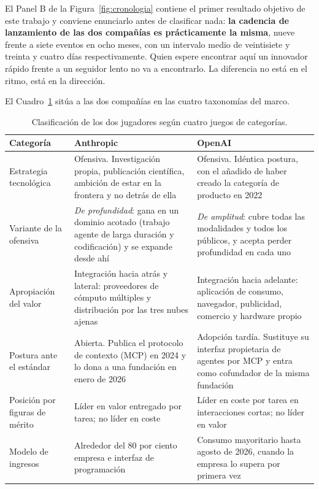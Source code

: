 \documentclass[11pt,letterpaper]{article}
\begin{document}
El Panel B de la Figura~\ref{fig:cronologia} contiene el primer resultado
objetivo de este trabajo y conviene enunciarlo antes de clasificar nada:
\textbf{la cadencia de lanzamiento de las dos compañías es prácticamente la
misma}, nueve frente a siete eventos en ocho meses, con un intervalo medio de
veintisiete y treinta y cuatro días respectivamente. Quien espere encontrar
aquí un innovador rápido frente a un seguidor lento no va a encontrarlo. La
diferencia no está en el ritmo, está en la dirección.

El Cuadro~\ref{tab:clasificacion} sitúa a las dos compañías en las cuatro
taxonomías del marco.

\begin{table}[tbp]
  \centering
  \small
  \caption{Clasificación de los dos jugadores según cuatro juegos de
  categorías.}
  \label{tab:clasificacion}
  \begin{tabularx}{\textwidth}{@{}>{\raggedright\arraybackslash}p{}
    >{\raggedright\arraybackslash}X >{\raggedright\arraybackslash}X@{}}
    \toprule
    \textbf{Categoría} & \textbf{Anthropic} & \textbf{OpenAI} \\
    \midrule
    Estrategia tecnológica \parencite{freeman1997}
      & Ofensiva. Investigación propia, publicación científica, ambición de
        estar en la frontera y no detrás de ella
      & Ofensiva. Idéntica postura, con el añadido de haber creado la categoría
        de producto en 2022 \\
    Variante de la ofensiva
      & \emph{De profundidad}: gana en un dominio acotado (trabajo agente de
        larga duración y codificación) y se expande desde ahí
      & \emph{De amplitud}: cubre todas las modalidades y todos los públicos, y
        acepta perder profundidad en cada uno \\
    Apropiación del valor \parencite{teece1986}
      & Integración hacia atrás y lateral: proveedores de cómputo múltiples y
        distribución por las tres nubes ajenas
      & Integración hacia adelante: aplicación de consumo, navegador,
        publicidad, comercio y hardware propio \\
    Postura ante el estándar \parencite{shapiro1999}
      & Abierta. Publica el protocolo de contexto (MCP) en 2024 y lo dona a una
        fundación en enero de 2026
      & Adopción tardía. Sustituye su interfaz propietaria de agentes por MCP y
        entra como cofundador de la misma fundación \\
    Posición por figuras de mérito \parencite{deweck2022}
      & Líder en valor entregado por tarea; no líder en coste
      & Líder en coste por tarea en interacciones cortas; no líder en valor \\
    Modelo de ingresos
      & Alrededor del 80 por ciento empresa e interfaz de programación
      & Consumo mayoritario hasta agosto de 2026, cuando la empresa lo supera
        por primera vez \\
    \bottomrule
  \end{tabularx}
\end{table}
\end{document}
